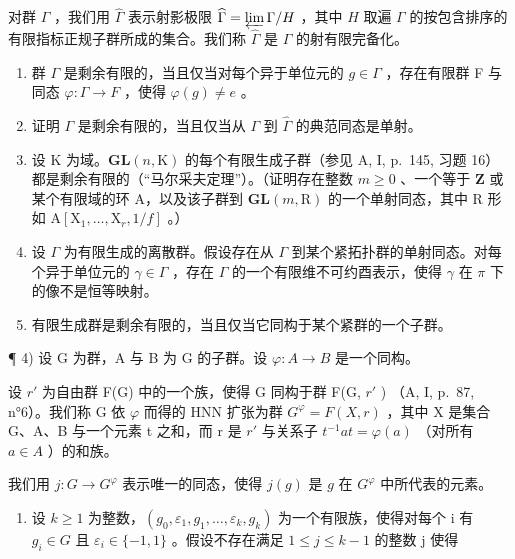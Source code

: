 对群 \(\Gamma\) ，我们用 \(\widehat{\Gamma}\) 表示射影极限 \(\widehat{\Gamma} = \varprojlim \Gamma / H\) ，其中 \(H\) 取遍 \(\Gamma\) 的按包含排序的有限指标正规子群所成的集合。我们称 \(\widehat{\Gamma}\) 是 \(\Gamma\) 的射有限完备化。

\begin{enumerate}
\def\labelenumi{\alph{enumi})}
\item
  群 \(\Gamma\) 是剩余有限的，当且仅当对每个异于单位元的 \(g \in \Gamma\) ，存在有限群 F 与同态 \(\varphi: \Gamma \to F\) ，使得 \(\varphi(g) \neq e\) 。
\item
  证明 \(\Gamma\) 是剩余有限的，当且仅当从 \(\Gamma\) 到 \(\widehat{\Gamma}\) 的典范同态是单射。
\item
  设 K 为域。\(\mathbf{GL}(n,\mathrm{K})\) 的每个有限生成子群（参见 A, I, p.~145, 习题 16）都是剩余有限的（“马尔采夫定理”）。（证明存在整数 \(m\geqslant 0\) 、一个等于 \(\mathbf{Z}\) 或某个有限域的环 A，以及该子群到 \(\mathbf{GL}(m,\mathrm{R})\) 的一个单射同态，其中 R 形如 \(\mathrm{A}[\mathrm{X}_1,\dots ,\mathrm{X}_r,1 / f]\) 。）
\item
  设 \(\Gamma\) 为有限生成的离散群。假设存在从 \(\Gamma\) 到某个紧拓扑群的单射同态。对每个异于单位元的 \(\gamma \in \Gamma\) ，存在 \(\Gamma\) 的一个有限维不可约酉表示，使得 \(\gamma\) 在 \(\pi\) 下的像不是恒等映射。
\item
  有限生成群是剩余有限的，当且仅当它同构于某个紧群的一个子群。
\end{enumerate}

¶ 4) 设 G 为群，A 与 B 为 G 的子群。设 \(\varphi\colon A\to B\) 是一个同构。

设 \(r'\) 为自由群 F(G) 中的一个族，使得 G 同构于群 F(G, \(r'\) ) （A, I, p.~87, n°6）。我们称 G 依 \(\varphi\) 而得的 HNN 扩张为群 \(G^{\varphi} = F(X, r)\) ，其中 X 是集合 G、A、B 与一个元素 t 之和，而 r 是 \(r'\) 与关系子 \(t^{-1}at = \varphi(a)\) （对所有 \(a \in A\) ）的和族。

我们用 \(j\colon G\to G^{\varphi}\) 表示唯一的同态，使得 \(j(g)\) 是 \(g\) 在 \(G^{\varphi}\) 中所代表的元素。

\begin{enumerate}
\def\labelenumi{\alph{enumi})}
\tightlist
\item
  设 \(k \geqslant 1\) 为整数，\((g_{0}, \varepsilon_{1}, g_{1}, \ldots, \varepsilon_{k}, g_{k})\) 为一个有限族，使得对每个 i 有 \(g_{i} \in G\) 且 \(\varepsilon_{i} \in \{-1, 1\}\) 。假设不存在满足 \(1 \leqslant j \leqslant k - 1\) 的整数 j 使得
\end{enumerate}

